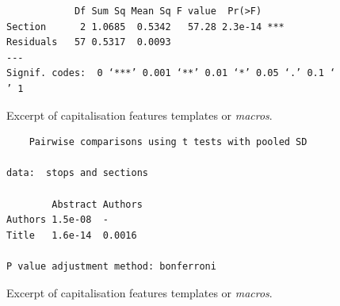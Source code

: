 \begin{figure}
\centering
\begin{BVerbatim}
            Df Sum Sq Mean Sq F value  Pr(>F)
Section      2 1.0685  0.5342   57.28 2.3e-14 ***
Residuals   57 0.5317  0.0093                    
---
Signif. codes:  0 ‘***’ 0.001 ‘**’ 0.01 ‘*’ 0.05 ‘.’ 0.1 ‘ ’ 1
\end{BVerbatim}
\caption{Excerpt of capitalisation features templates or \emph{macros}.}
\label{fig:anova}
\end{figure}

\begin{figure}
\centering
\begin{BVerbatim}
	Pairwise comparisons using t tests with pooled SD

data:  stops and sections

        Abstract Authors
Authors 1.5e-08  -      
Title   1.6e-14  0.0016

P value adjustment method: bonferroni
\end{BVerbatim}
\caption{Excerpt of capitalisation features templates or \emph{macros}.}
\label{fig:ttest}
\end{figure}
